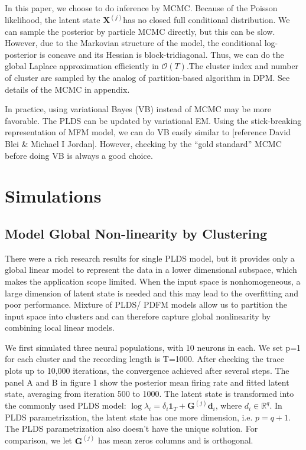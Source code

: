 \documentclass{article}
\begin{document}
	In this paper, we choose to do inference by MCMC. Because of the Poisson likelihood, the latent state $\bm{X}^{(j)}$has no closed full conditional distribution. We can sample the posterior by particle MCMC directly, but this can be slow. However, due to the Markovian structure of the model, the conditional log-posterior is concave and its Hessian is block-tridiagonal. Thus, we can do the global Laplace approximation efficiently in $\mathcal{O}(T)$.The cluster index and number of cluster are sampled by the analog of partition-based algorithm in DPM. See details of the MCMC in appendix.
	
	In practice, using variational Bayes (VB) instead of MCMC may be more favorable. The PLDS can be updated by variational EM. Using the stick-breaking representation of MFM model, we can do VB easily similar to [reference David Blei \& Michael I Jordan]. However, checking by the “gold standard” MCMC before doing VB is always a good choice. 
	
	\section{Simulations}
	\label{sim}
	
	\subsection{Model Global Non-linearity by Clustering}
	There were a rich research results for single PLDS model, but it provides only a global linear model to represent the data in a lower dimensional subspace, which makes the application scope limited. When the input space is nonhomogeneous, a large dimension of latent state is needed and this may lead to the overfitting and poor performance. Mixture of PLDS/ PDFM models allow us to partition the input space into clusters and can therefore capture global nonlinearity by combining local linear models.
	
	We first simulated three neural populations, with 10 neurons in each. We set p=1 for each cluster and the recording length is T=1000. After checking the trace plots up to 10,000 iterations, the convergence achieved after several steps. The panel A and B in figure 1 show the posterior mean firing rate and fitted latent state, averaging from iteration 500 to 1000. The latent state is transformed into the commonly used PLDS model: $\log \lambda_i = \delta_i\bm{1}_T + \bm{G}^{(j)}\bm{d}_i$, where $d_i\in \mathbb{R}^q$. In PLDS parametrization, the latent state has one more dimension, i.e. $p=q+1$. The PLDS parametrization also doesn't have the unique solution. For comparison, we let $\bm{G}^{(j)}$ has mean zeros columns and is orthogonal.
	
\end{document}

